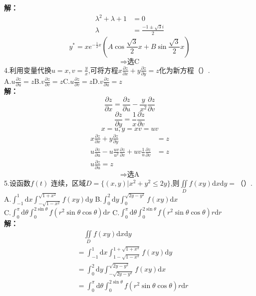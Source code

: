 \documentclass[a4paper]{article}
\begin{document}
\textbf{解：}
\begin{align*}
    \lambda^2 + \lambda +1 &=0\\
    \lambda&=\frac{-1 \pm \sqrt{3}i}{2}
\end{align*}
$$y^{*}=xe^{-\frac{1}{2}x}\left(A\cos \frac{\sqrt{3}}{2}x+B\sin \frac{\sqrt{3}}{2}x\right)$$
$$\Rightarrow \text{选C}$$
4.利用变量代换$u=x,v=\frac{y}{x}$,可将方程$x\frac{\partial z}{\partial x}+y\frac{\partial z}{\partial y}=z$化为新方程（\quad）.\\
A.$u\frac{\partial z}{\partial u}=z$\hfill B.$v\frac{\partial z}{\partial v}=z$\hfill C.$u\frac{\partial z}{\partial v}=z $\hfill  D.$v\frac{\partial z}{\partial u}=z$\\
\textbf{解：}
$$\frac{\partial z}{\partial x}=\frac{\partial z}{\partial u}-\frac{y}{x^2}\frac{\partial z}{\partial v}$$
$$\frac{\partial z}{\partial y}=\frac{1}{x}\frac{\partial z}{\partial v}$$
$$x=u,y=xv=uv$$
\begin{align*}
    x\frac{\partial z}{\partial x}+y\frac{\partial z}{\partial y}&=z\\
    u\frac{\partial z}{\partial u}-u\frac{uv}{u^2}\frac{\partial z}{\partial v}+uv\frac{1}{u}\frac{\partial z}{\partial v}&=z\\
    u\frac{\partial z}{\partial u}=z
\end{align*}
$$\Rightarrow \text{选A}$$
5.设函数$f(t)$ 连续，区域$D=\{\left. \left(x,y\right) \right| x^2+y^2\le 2y \}$,则$\iint\limits_{D}f(xy)\mathrm{d}x\mathrm{d}y=$（\quad）.\\
A.$\int_{-1}^{1}\mathrm{d}x\int_{-\sqrt{1-x^2}}^{\sqrt{1+x^2}}f(xy)\mathrm{d}y$\hfill
B.$\int_{0}^{2}\mathrm{d}y\int_{0}^{\sqrt{2y-y^2}}f(xy)\mathrm{d}x$\\
C.$\int_{0}^{\pi}\mathrm{d}\theta\int_{0}^{2\sin \theta}f(r^2\sin\theta\cos\theta)\mathrm{d}r$\hfill
C.$\int_{0}^{\pi}\mathrm{d}\theta\int_{0}^{2\sin \theta}f(r^2\sin\theta\cos\theta)r\mathrm{d}r$\\
\textbf{解：}
\begin{align*}
    &\quad \iint\limits_{D}f(xy)\mathrm{d}x\mathrm{d}y\\
    &= \int_{-1}^{1}\mathrm{d}x\int_{1-\sqrt{1-x^2}}^{1+\sqrt{1+x^2}}f(xy)\mathrm{d}y\\
    &= \int_{0}^{2}\mathrm{d}y\int_{-\sqrt{2y-y^2}}^{\sqrt{2y-y^2}}f(xy)\mathrm{d}x\\
    &= \int_{0}^{\pi}\mathrm{d}\theta\int_{0}^{2\sin \theta}f(r^2\sin\theta\cos\theta)r\mathrm{d}r
\end{align*}
\end{document}
